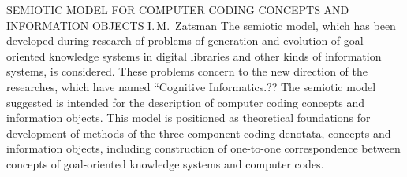 
SEMIOTIC MODEL FOR COMPUTER CODING CONCEPTS AND INFORMATION OBJECTS 
I.\,M.~Zatsman
The semiotic model, which has been developed during research of problems of 
generation and evolution of goal-oriented knowledge systems in digital libraries 
and other kinds of information systems, is considered. These problems concern to 
the new direction of the researches, which have named ``Cognitive Informatics.?? 
The semiotic model suggested is intended for the description of computer coding 
concepts and information objects. This model is positioned as theoretical 
foundations for development of methods of the three-component coding denotata, 
concepts and information objects, including construction of one-to-one 
correspondence between concepts of goal-oriented knowledge systems and 
computer codes.
 